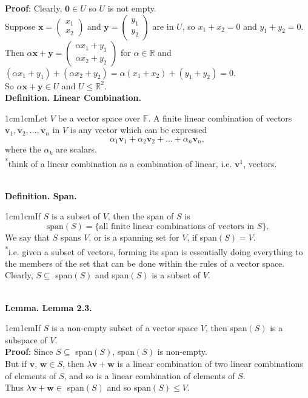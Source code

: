 \documentclass{article}
\newcommand{\vect}[1]{\mathbf{#1}}
\newcommand{\definition}[2]{\textbf{Definition. #1.}\begin{adjustwidth}{1cm}{1cm}#2\end{adjustwidth}}
\newcommand{\lemma}[2]{\textbf{Lemma. #1.}\begin{adjustwidth}{1cm}{1cm}#2\end{adjustwidth}}
\begin{document}
\textbf{Proof}: Clearly, $\vect{0} \in U$ so $U$ is not empty.\\Suppose $\vect{x} = \begin{pmatrix}x_1 \\ x_2\end{pmatrix}$ and $\vect{y} = \begin{pmatrix}y_1 \\ y_2\end{pmatrix}$ are in $U$, so $x_1 + x_2 = 0$ and $y_1 + y_2 = 0$.\\Then $\alpha\vect{x} + \vect{y} = \begin{pmatrix}\alpha x_1 + y_1 \\ \alpha x_2 + y_2\end{pmatrix}$ for $\alpha \in \mathbb{R}$ and $(\alpha x_1 + y_1) + (\alpha x_2 + y_2) = \alpha(x_1 + x_2) + (y_1 + y_2) = 0$.\\So $\alpha \vect{x} + \vect{y} \in U$ and $U \leq \mathbb{R}^2$.\\[1\baselineskip]
\definition{Linear Combination}{Let $V$ be a vector space over $\mathbb{F}$. A finite linear combination of vectors $\vect{v}_1, \vect{v}_2, \ldots, \vect{v}_n$ in $V$ is any vector which can be expressed\[\alpha_1 \vect{v}_1 + \alpha_2 \vect{v}_2 + \ldots + \alpha _n \vect{v}_n ,\]where the $\alpha_k$ are scalars.\\[1\baselineskip]\textsuperscript{*}think of a linear combination as a combination of linear, i.e. $\vect{v}^1$, vectors.}~\\
\definition{Span}{If $S$ is a subset of $V$, then the span of $S$ is \[\text{span}(S) = \{\text{all finite linear combinations of vectors in }S\}.\]We say that $S$ spans $V$, or is a spanning set for $V$, if span$(S) = V$.\\[1\baselineskip]\textsuperscript{*}i.e. given a subset of vectors, forming its span is essentially doing everything to the members of the set that can be done within the rules of a vector space.\\Clearly, $S \subseteq$ span$(S)$ and span$(S)$ is a subset of $V$.}~\\
\lemma{Lemma 2.3}{If $S$ is a non-empty subset of a vector space $V$, then span$(S)$ is a subspace of $V$.\\[1\baselineskip]\textbf{Proof}: Since $S \subseteq$ span$(S)$, span$(S)$ is non-empty.\\But if $\vect{v}$, $\vect{w} \in S$, then $\lambda \vect{v} + \vect{w}$ is a linear combination of two linear combinations of elements of $S$, and so is a linear combination of elements of $S$.\\Thus $\lambda \vect{v} + \vect{w} \in$ span$(S)$ and so span$(S) \leq V$.}~\\
\end{document}
